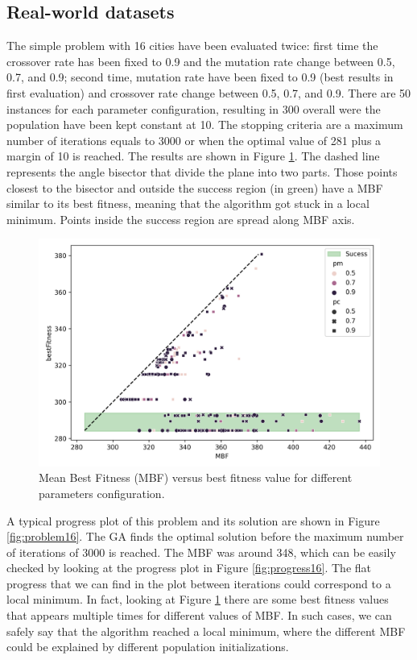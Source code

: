 \documentclass[10pt,a4paper]{article}
\begin{document}
\subsection*{Real-world datasets}
The simple problem with 16 cities have been evaluated twice: first time the crossover rate has been fixed to 0.9 and the mutation rate change between 0.5, 0.7, and 0.9; second time, mutation rate have been fixed to 0.9 (best results in first evaluation) and crossover rate change between 0.5, 0.7, and 0.9. There are 50 instances for each parameter configuration, resulting in 300 overall were the population have been kept constant at 10. The stopping criteria are a maximum number of iterations equals to 3000 or when the optimal value of 281 plus a margin of 10 is reached. The results are shown in Figure \ref{fig:mbfvsbf16}. The dashed line represents the angle bisector that divide the plane into two parts. Those points closest to the bisector and outside the success region (in green) have a MBF similar to its best fitness, meaning that the algorithm got stuck in a local minimum. Points inside the success region are spread along MBF axis. 

\begin{figure}[h!]
    \centering
    \includegraphics[scale=0.75]{../figures/16citiesMBFvsbF.png}
    \caption{Mean Best Fitness (MBF) versus best fitness value for different parameters configuration.}
    \label{fig:mbfvsbf16}
\end{figure}

A typical progress plot of this problem and its solution are shown in Figure \ref{fig:problem16}. The GA finds the optimal solution before the maximum number of iterations of 3000 is reached. The MBF was around 348, which can be easily checked by looking at the progress plot in Figure \ref{fig:progress16}. The flat progress that we can find in the plot between iterations could correspond to a local minimum. In fact, looking at Figure \ref{fig:mbfvsbf16} there are some best fitness values that appears multiple times for different values of MBF. In such cases, we can safely say that the algorithm reached a local minimum, where the different MBF could be explained by different population initializations.
\end{document}
